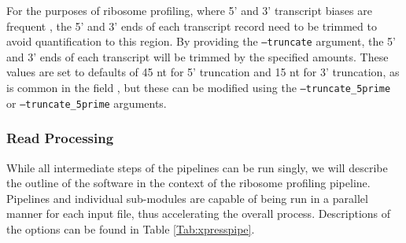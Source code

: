 \documentclass[11pt, a4paper, oneside]{article}
\begin{document}
For the purposes of ribosome profiling, where 5' and 3' transcript biases are frequent \cite{ingolia_meth, weinberg_reports}, the 5' and 3' ends of each transcript record need to be trimmed to avoid quantification to this region. By providing the \texttt{--truncate} argument, the 5' and 3' ends of each transcript will be trimmed by the specified amounts. These values are set to defaults of 45 nt for 5' truncation and 15 nt for 3' truncation, as is common in the field \cite{ingolia_meth}, but these can be modified using the \texttt{--truncate_5prime} or \texttt{--truncate_5prime} arguments.

\subsubsection{Read Processing}
While all intermediate steps of the pipelines can be run singly, we will describe the outline of the software in the context of the ribosome profiling pipeline. Pipelines and individual sub-modules are capable of being run in a parallel manner for each input file, thus accelerating the overall process. Descriptions of the options can be found in Table \ref{Tab:xpresspipe}.
\end{document}
